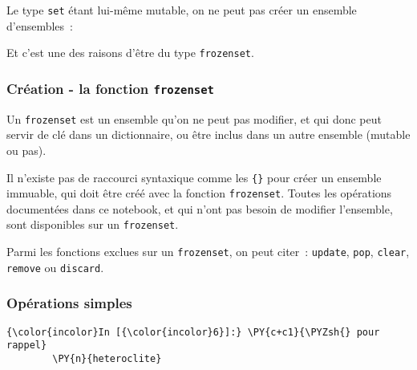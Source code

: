     Le type \texttt{set} étant lui-même mutable, on ne peut pas créer un
ensemble d'ensembles~:

    \begin{Shaded}
\begin{Highlighting}[]
\OperatorTok{>>>}\OperatorTok{=}\NormalTok{ \{\{}\NormalTok{, }\NormalTok{\}\}}
\NormalTok{, } \OperatorTok{<}\OperatorTok{>}
\NormalTok{: }
\end{Highlighting}
\end{Shaded}

    Et c'est une des raisons d'être du type \texttt{frozenset}.

    \hypertarget{cruxe9ation---la-fonction-frozenset}{%
\subsubsection{\texorpdfstring{Création - la fonction
\texttt{frozenset}}{Création - la fonction frozenset}}\label{cruxe9ation---la-fonction-frozenset}}

    Un \texttt{frozenset} est un ensemble qu'on ne peut pas modifier, et qui
donc peut servir de clé dans un dictionnaire, ou être inclus dans un
autre ensemble (mutable ou pas).

    Il n'existe pas de raccourci syntaxique comme les \texttt{\{\}} pour
créer un ensemble immuable, qui doit être créé avec la fonction
\texttt{frozenset}. Toutes les opérations documentées dans ce notebook,
et qui n'ont pas besoin de modifier l'ensemble, sont disponibles sur un
\texttt{frozenset}.

Parmi les fonctions exclues sur un \texttt{frozenset}, on peut citer~:
\texttt{update}, \texttt{pop}, \texttt{clear}, \texttt{remove} ou
\texttt{discard}.

    \hypertarget{opuxe9rations-simples}{%
\subsubsection{Opérations simples}\label{opuxe9rations-simples}}

    \begin{Verbatim}[commandchars=\\\{\}]
{\color{incolor}In [{\color{incolor}6}]:} \PY{c+c1}{\PYZsh{} pour rappel}
        \PY{n}{heteroclite}
\end{Verbatim}


